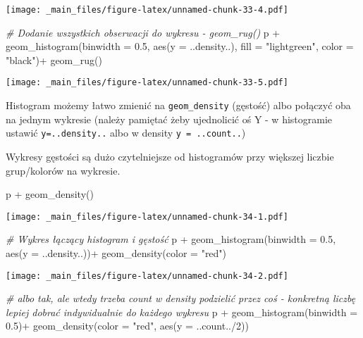 \documentclass[
]{book}
\newenvironment{Shaded}{\begin{snugshade}}{\end{snugshade}}
\newcommand{\AttributeTok}[1]{\textcolor[rgb]{0.77,0.63,0.00}{#1}}
\newcommand{\CommentTok}[1]{\textcolor[rgb]{0.56,0.35,0.01}{\textit{#1}}}
\newcommand{\DecValTok}[1]{\textcolor[rgb]{0.00,0.00,0.81}{#1}}
\newcommand{\FloatTok}[1]{\textcolor[rgb]{0.00,0.00,0.81}{#1}}
\newcommand{\FunctionTok}[1]{\textcolor[rgb]{0.00,0.00,0.00}{#1}}
\newcommand{\NormalTok}[1]{#1}
\newcommand{\SpecialCharTok}[1]{\textcolor[rgb]{0.00,0.00,0.00}{#1}}
\newcommand{\StringTok}[1]{\textcolor[rgb]{0.31,0.60,0.02}{#1}}
\begin{document}
\texttt{[image: \_main\_files/figure-latex/unnamed-chunk-33-4.pdf]}

\begin{Shaded}
\begin{Highlighting}[]
\CommentTok{\# Dodanie wszystkich obserwacji do wykresu {-} geom\_rug()}
\NormalTok{p }\SpecialCharTok{+} \FunctionTok{geom\_histogram}\NormalTok{(}\AttributeTok{binwidth =} \FloatTok{0.5}\NormalTok{, }\FunctionTok{aes}\NormalTok{(}\AttributeTok{y =}\NormalTok{ ..density..), }
                   \AttributeTok{fill =} \StringTok{"lightgreen"}\NormalTok{, }\AttributeTok{color =} \StringTok{"black"}\NormalTok{)}\SpecialCharTok{+}
  \FunctionTok{geom\_rug}\NormalTok{()}
\end{Highlighting}
\end{Shaded}

\texttt{[image: \_main\_files/figure-latex/unnamed-chunk-33-5.pdf]}

Histogram możemy łatwo zmienić na \texttt{geom\_density} (gęstość) albo połączyć oba na jednym wykresie (należy pamiętać żeby ujednolicić oś Y - w histogramie ustawić \texttt{y=..density..} albo w density \texttt{y\ =\ ..count..})

Wykresy gęstości są dużo czytelniejsze od histogramów przy większej liczbie grup/kolorów na wykresie.

\begin{Shaded}
\begin{Highlighting}[]
\NormalTok{p }\SpecialCharTok{+} \FunctionTok{geom\_density}\NormalTok{()}
\end{Highlighting}
\end{Shaded}

\texttt{[image: \_main\_files/figure-latex/unnamed-chunk-34-1.pdf]}

\begin{Shaded}
\begin{Highlighting}[]
\CommentTok{\# Wykres łączący histogram i gęstość}
\NormalTok{p }\SpecialCharTok{+} \FunctionTok{geom\_histogram}\NormalTok{(}\AttributeTok{binwidth =} \FloatTok{0.5}\NormalTok{, }\FunctionTok{aes}\NormalTok{(}\AttributeTok{y =}\NormalTok{ ..density..))}\SpecialCharTok{+}
  \FunctionTok{geom\_density}\NormalTok{(}\AttributeTok{color =} \StringTok{"red"}\NormalTok{)}
\end{Highlighting}
\end{Shaded}

\texttt{[image: \_main\_files/figure-latex/unnamed-chunk-34-2.pdf]}

\begin{Shaded}
\begin{Highlighting}[]
\CommentTok{\# albo tak, ale wtedy trzeba count w density podzielić przez coś {-} konkretną liczbę lepiej dobrać indywidualnie do każdego wykresu}
\NormalTok{p }\SpecialCharTok{+} \FunctionTok{geom\_histogram}\NormalTok{(}\AttributeTok{binwidth =} \FloatTok{0.5}\NormalTok{)}\SpecialCharTok{+}
  \FunctionTok{geom\_density}\NormalTok{(}\AttributeTok{color =} \StringTok{"red"}\NormalTok{, }\FunctionTok{aes}\NormalTok{(}\AttributeTok{y =}\NormalTok{ ..count..}\SpecialCharTok{/}\DecValTok{2}\NormalTok{))}
\end{Highlighting}
\end{Shaded}
\end{document}
